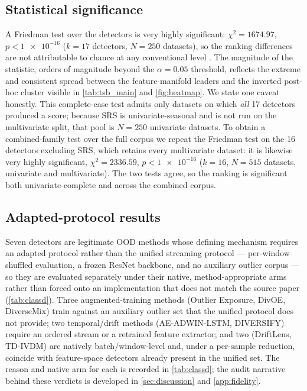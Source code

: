 \subsection{Statistical significance}\label{sec:results-stats}
A Friedman test over the detectors is very highly significant:
$\chi^2 = \num{1674.97}$, $p < \num{1e-16}$ ($k = \num{17}$ detectors,
$N = \num{250}$ datasets), so the ranking differences are not attributable to
chance at any conventional level \citep{Demsar2006}. The magnitude of the
statistic, orders of magnitude beyond the $\alpha = 0.05$ threshold, reflects the
extreme and consistent spread between the feature-manifold leaders and the
inverted post-hoc cluster visible in \cref{tab:tsb_main} and \cref{fig:heatmap}.
We state one caveat honestly. This complete-case test admits only datasets on which
\emph{all} \num{17} detectors produced a score; because SRS is univariate-seasonal
and is not run on the multivariate split, that pool is $N = \num{250}$ univariate
datasets. To obtain a combined-family test over the full corpus we repeat the
Friedman test on the \num{16} detectors excluding SRS, which retains every
multivariate dataset: it is likewise very highly significant, $\chi^2 =
\num{2336.59}$, $p < \num{1e-16}$ ($k = \num{16}$, $N = \num{515}$ datasets,
univariate and multivariate). The two tests agree, so the ranking is significant
both univariate-complete and across the combined corpus.

\subsection{Adapted-protocol results}\label{sec:results-classd}
Seven detectors are legitimate OOD methods whose defining mechanism requires an
adapted protocol rather than the unified streaming protocol --- per-window shuffled
evaluation, a frozen ResNet backbone, and no auxiliary outlier corpus --- so they are
evaluated separately under their native, method-appropriate arms rather than forced
onto an implementation that does not match the source paper (\cref{tab:classd}). Three
augmented-training methods (Outlier Exposure, DivOE, DiverseMix) train against an
auxiliary outlier set that the unified protocol does not provide; two temporal/drift
methods (AE-ADWIN-LSTM, DIVERSIFY) require an ordered stream or a retrained feature
extractor; and two (DriftLens, TD-IVDM) are natively batch/window-level and, under a
per-sample reduction, coincide with feature-space detectors already present in the
unified set. The reason and native arm for each is recorded in \cref{tab:classd}; the
audit narrative behind these verdicts is developed in \cref{sec:discussion} and
\cref{app:fidelity}.


